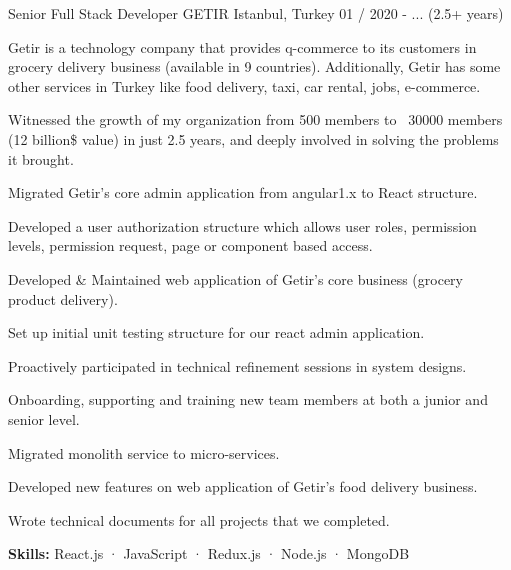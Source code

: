 

\begin{cventries}

  \cventry
    {Senior Full Stack Developer} %
    {GETIR} %
    {Istanbul, Turkey} %
    {01 / 2020 - ... (2.5+ years)}
    {
      \begin{cvitems} %
        \item {Getir is a technology company that provides q-commerce to its customers in grocery delivery business (available in 9 countries). Additionally, Getir has some other services in Turkey like food delivery, taxi, car rental, jobs, e-commerce.}
        \item {Witnessed the growth of my organization from 500 members to ~30000 members (12 billion{\$} value) in just 2.5 years, and deeply involved in solving the problems it brought.}
        \item {Migrated Getir's core admin application from angular1.x to React structure.}
        \item {Developed a user authorization structure which allows user roles, permission levels, permission request, page or component based access.}
        \item {Developed {\&} Maintained web application of Getir's core business (grocery product delivery).}
        \item {Set up initial unit testing structure for our react admin application.}
        \item {Proactively participated in technical refinement sessions in system designs.}
        \item {Onboarding, supporting and training new team members at both a junior and senior level.}
        \item {Migrated monolith service to micro-services.}
        \item {Developed new features on web application of Getir's food delivery business.}
        \item {Wrote technical documents for all projects that we completed.}
        \item {\textbf {Skills:} React.js · JavaScript · Redux.js · Node.js · MongoDB}
      \end{cvitems}
    }


\end{cventries}
